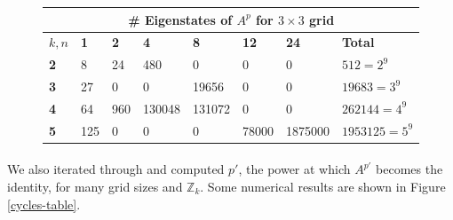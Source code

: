 \documentclass[11pt]{article}
\newcommand{\modZ}[1]{$\mathbb{Z}_{#1}$}
\begin{document}
\begin{figure}[H]
\begin{center}
  \begin{tabular}{|l|l|l|l|l|l|l|l|}
    \hline
    \multicolumn{8}{|c|}{\# Eigenstates of $A^p$ for $3 \times 3$ grid} \\ \hline
    $k, n$&\textbf{1}&\textbf{2}&\textbf{4}&\textbf{8}&\textbf{12}&\textbf{24}&\textbf{Total}\\ \hline
    \textbf{2}  & 8   & 24   & 480    & 0      & 0     & 0       & $512=2^9$ \\ \hline
    \textbf{3}  & 27  & 0    & 0      & 19656  & 0     & 0       & $19683=3^9$ \\ \hline
    \textbf{4}  & 64  & 960  & 130048 & 131072 & 0     & 0       & $262144=4^9$ \\ \hline
    \textbf{5}  & 125 & 0    & 0      & 0      & 78000 & 1875000 & $1953125=5^9$ \\ \hline
  \end{tabular}
  \end{center}
\end{figure}

\paragraph{} We also iterated through and computed $p'$, the power at which $A^{p'}$ becomes the identity, for many grid sizes and \modZ{k}. Some numerical results are shown in Figure \ref{cycles-table}.
\end{document}
